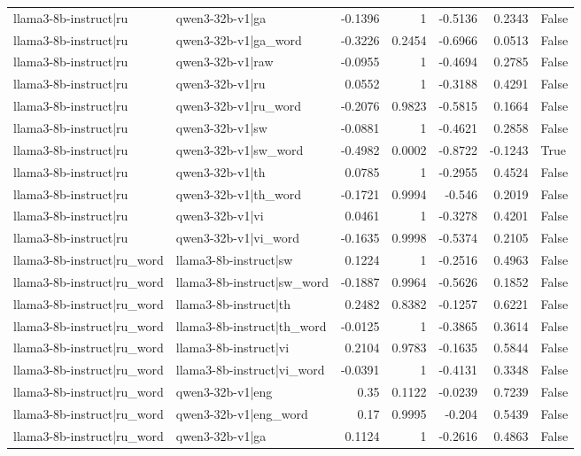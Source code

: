 \begin{table}
\begin{tabular}{l l r r r r l}
llama3-8b-instruct|ru & qwen3-32b-v1|ga & -0.1396 & 1 & -0.5136 & 0.2343 & False \\
llama3-8b-instruct|ru & qwen3-32b-v1|ga_word & -0.3226 & 0.2454 & -0.6966 & 0.0513 & False \\
llama3-8b-instruct|ru & qwen3-32b-v1|raw & -0.0955 & 1 & -0.4694 & 0.2785 & False \\
llama3-8b-instruct|ru & qwen3-32b-v1|ru & 0.0552 & 1 & -0.3188 & 0.4291 & False \\
llama3-8b-instruct|ru & qwen3-32b-v1|ru_word & -0.2076 & 0.9823 & -0.5815 & 0.1664 & False \\
llama3-8b-instruct|ru & qwen3-32b-v1|sw & -0.0881 & 1 & -0.4621 & 0.2858 & False \\
llama3-8b-instruct|ru & qwen3-32b-v1|sw_word & -0.4982 & 0.0002 & -0.8722 & -0.1243 & True \\
llama3-8b-instruct|ru & qwen3-32b-v1|th & 0.0785 & 1 & -0.2955 & 0.4524 & False \\
llama3-8b-instruct|ru & qwen3-32b-v1|th_word & -0.1721 & 0.9994 & -0.546 & 0.2019 & False \\
llama3-8b-instruct|ru & qwen3-32b-v1|vi & 0.0461 & 1 & -0.3278 & 0.4201 & False \\
llama3-8b-instruct|ru & qwen3-32b-v1|vi_word & -0.1635 & 0.9998 & -0.5374 & 0.2105 & False \\
llama3-8b-instruct|ru_word & llama3-8b-instruct|sw & 0.1224 & 1 & -0.2516 & 0.4963 & False \\
llama3-8b-instruct|ru_word & llama3-8b-instruct|sw_word & -0.1887 & 0.9964 & -0.5626 & 0.1852 & False \\
llama3-8b-instruct|ru_word & llama3-8b-instruct|th & 0.2482 & 0.8382 & -0.1257 & 0.6221 & False \\
llama3-8b-instruct|ru_word & llama3-8b-instruct|th_word & -0.0125 & 1 & -0.3865 & 0.3614 & False \\
llama3-8b-instruct|ru_word & llama3-8b-instruct|vi & 0.2104 & 0.9783 & -0.1635 & 0.5844 & False \\
llama3-8b-instruct|ru_word & llama3-8b-instruct|vi_word & -0.0391 & 1 & -0.4131 & 0.3348 & False \\
llama3-8b-instruct|ru_word & qwen3-32b-v1|eng & 0.35 & 0.1122 & -0.0239 & 0.7239 & False \\
llama3-8b-instruct|ru_word & qwen3-32b-v1|eng_word & 0.17 & 0.9995 & -0.204 & 0.5439 & False \\
llama3-8b-instruct|ru_word & qwen3-32b-v1|ga & 0.1124 & 1 & -0.2616 & 0.4863 & False \\

\end{tabular}
\end{table}
